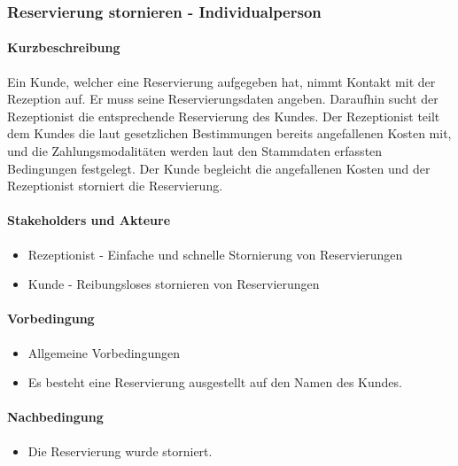 \subsubsection{Reservierung stornieren - Individualperson}
\label{UseCase_ReservierungStornierenIndividualperson}

\paragraph{Kurzbeschreibung}
Ein \Gls{Kunde}, welcher eine \Gls{Reservierung} aufgegeben hat, nimmt Kontakt mit der \Gls{Rezeption} auf. Er muss seine Reservierungsdaten angeben. Daraufhin sucht der \Gls{Rezeptionist} die entsprechende \Gls{Reservierung} des \Glspl{Kunde}. Der \Gls{Rezeptionist} teilt dem \Glspl{Kunde} die laut gesetzlichen Bestimmungen bereits angefallenen Kosten mit, und die Zahlungsmodalitäten werden laut den \Gls{Stammdaten} erfassten Bedingungen festgelegt. Der \Gls{Kunde} begleicht die angefallenen Kosten und der \Gls{Rezeptionist} storniert die \Gls{Reservierung}.

\paragraph{Stakeholders und Akteure}
\begin{itemize}
\item \Gls{Rezeptionist} - Einfache und schnelle Stornierung von Reservierungen
\item \Gls{Kunde} - Reibungsloses stornieren von Reservierungen
\end{itemize}

\paragraph{Vorbedingung}
\begin{itemize}
\item Allgemeine Vorbedingungen
\item Es besteht eine \Gls{Reservierung} ausgestellt auf den Namen des \Glspl{Kunde}.
\end{itemize}

\paragraph{Nachbedingung}
\begin{itemize}
\item Die \Gls{Reservierung} wurde storniert.
\end{itemize}

